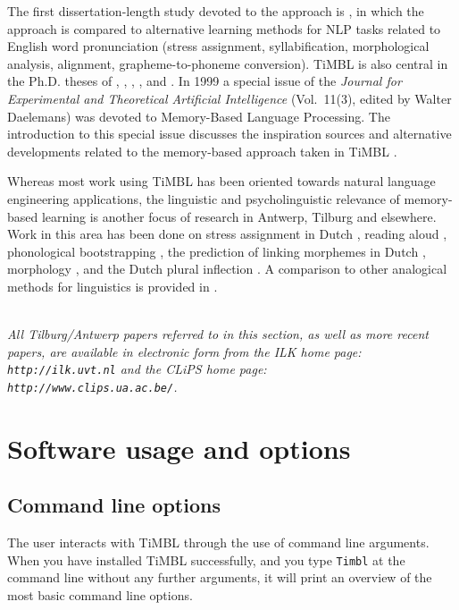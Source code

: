 \documentclass{report}
\begin{document}
The first dissertation-length study devoted to the approach is
\cite{VandenBosch97}, in which the approach is compared to alternative
learning methods for NLP tasks related to English word pronunciation
(stress assignment, syllabification, morphological analysis,
alignment, grapheme-to-phoneme conversion). TiMBL is also central in
the Ph.D. theses of , ,
 ,
, and . In 1999 a special issue of the {\em Journal for
  Experimental and Theoretical Artificial Intelligence} (Vol.~11(3),
edited by Walter Daelemans) was devoted to Memory-Based Language
Processing. The introduction to this special issue discusses the
inspiration sources and alternative developments related to the
memory-based approach taken in TiMBL \cite{Daelemans99b}.

Whereas most work using TiMBL has been oriented towards natural
language engineering applications, the linguistic and psycholinguistic
relevance of memory-based learning is another focus of research in
Antwerp, Tilburg and elsewhere. Work in this area has been done on
stress assignment in Dutch \cite{Daelemans+94,Gillis+00}, reading
aloud \cite{VandenBosch+00b}, phonological bootstrapping
\cite{Durieux+00}, the prediction of linking morphemes
in Dutch \cite{Krott+01}, morphology \cite{Eddington00,Eddington03},
and the Dutch plural inflection \cite{Keuleers+07}. A comparison to
other analogical methods for linguistics is provided in
\cite{Daelemans+97f,Daelemans02}.

\ \\

{\it All Tilburg/Antwerp papers referred to in this section, as well
as more recent papers, are available in electronic form from the {\sc
ILK} home page: {\tt http://ilk.uvt.nl} and the {\sc CLiPS} home page: \\
{\tt http://www.clips.ua.ac.be/}.}

\chapter{Software usage and options}
\label{reference}

\section{Command line options}
\label{commandline}

The user interacts with TiMBL through the use of command line arguments.
When you have installed TiMBL successfully, and you type {\tt Timbl} at the
command line without any further arguments, it will print an overview
of the most basic command line options. 
\end{document}
